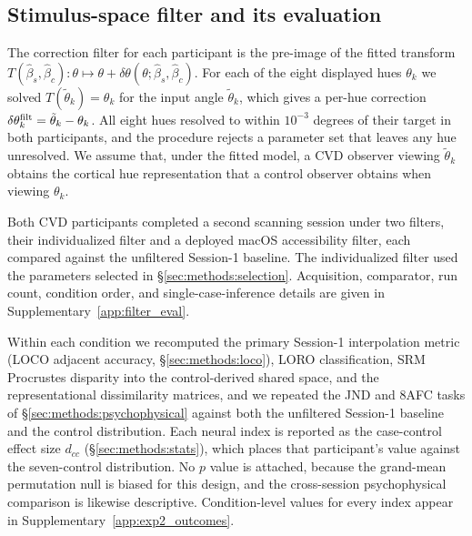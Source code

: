 \subsection{Stimulus-space filter and its evaluation}
\label{sec:methods:filter}
\label{sec:methods:filter_eval}

The correction filter for each participant is the pre-image of the fitted transform $T(\hat{\beta}_s, \hat{\beta}_c): \theta \mapsto \theta + \delta\theta(\theta;\hat{\beta}_s,\hat{\beta}_c)$. For each of the eight displayed hues $\theta_k$ we solved $T(\tilde{\theta}_k) = \theta_k$ for the input angle $\tilde{\theta}_k$, which gives a per-hue correction $\delta\theta_k^{\rm filt} = \tilde{\theta}_k - \theta_k$. All eight hues resolved to within $10^{-3}$ degrees of their target in both participants, and the procedure rejects a parameter set that leaves any hue unresolved. We assume that, under the fitted model, a CVD observer viewing $\tilde{\theta}_k$ obtains the cortical hue representation that a control observer obtains when viewing $\theta_k$.

Both CVD participants completed a second scanning session under two filters, their individualized filter and a deployed macOS accessibility filter, each compared against the unfiltered Session-1 baseline. The individualized filter used the parameters selected in \S\ref{sec:methods:selection}. Acquisition, comparator, run count, condition order, and single-case-inference details are given in Supplementary~\cref{app:filter_eval}.

Within each condition we recomputed the primary Session-1 interpolation metric (LOCO adjacent accuracy, \S\ref{sec:methods:loco}), LORO classification, SRM Procrustes disparity into the control-derived shared space, and the representational dissimilarity matrices, and we repeated the JND and 8AFC tasks of \S\ref{sec:methods:psychophysical} against both the unfiltered Session-1 baseline and the control distribution. Each neural index is reported as the case-control effect size $d_{cc}$ (\S\ref{sec:methods:stats}), which places that participant's value against the seven-control distribution. No $p$ value is attached, because the grand-mean permutation null is biased for this design, and the cross-session psychophysical comparison is likewise descriptive. Condition-level values for every index appear in Supplementary~\cref{app:exp2_outcomes}.


